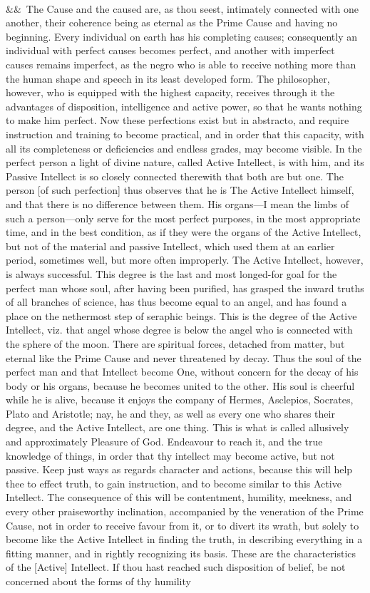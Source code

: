 \documentclass[12pt]{article}
\newcommand{\para}[1][]{\par\noindent\ifx&#1&\else\textsuperscript{\footnotesize #1}~\fi}
\begin{document}
\para The Cause and the caused are, as thou seest, intimately connected with one another, their coherence being as eternal as the Prime Cause and having no beginning. Every individual on earth has his completing causes; consequently an individual with perfect causes becomes perfect, and another with imperfect causes remains imperfect, as the negro who is able to receive nothing more than the human shape and speech in its least developed form. The philosopher, however, who is equipped with the highest capacity, receives through it the advantages of disposition, intelligence and active power, so that he wants nothing to make him perfect. Now these perfections exist but in abstracto, and require instruction and training to become practical, and in order that this capacity, with all its completeness or deficiencies and endless grades, may become visible. In the perfect person a light of divine nature, called Active Intellect, is with him, and its Passive Intellect is so closely connected therewith that both are but one. The person [of such perfection] thus observes that he is The Active Intellect himself, and that there is no difference between them. His organs---I mean the limbs of such a person---only serve for the most perfect purposes, in the most appropriate time, and in the best condition, as if they were the organs of the Active Intellect, but not of the material and passive Intellect, which used them at an earlier period, sometimes well, but more often improperly. The Active Intellect, however, is always successful. This degree is the last and most longed-for goal for the perfect man whose soul, after having been purified, has grasped the inward truths of all branches of science, has thus become equal to an angel, and has found a place on the nethermost step of seraphic beings. This is the degree of the Active Intellect, viz. that angel whose degree is below the angel who is connected with the sphere of the moon. There are spiritual forces, detached from matter, but eternal like the Prime Cause and never threatened by decay. Thus the soul of the perfect man and that Intellect become One, without concern for the decay of his body or his organs, because he becomes united to the other. His soul is cheerful while he is alive, because it enjoys the company of Hermes, Asclepios, Socrates, Plato and Aristotle; nay, he and they, as well as every one who shares their degree, and the Active Intellect, are one thing. This is what is called allusively and approximately Pleasure of God. Endeavour to reach it, and the true knowledge of things, in order that thy intellect may become active, but not passive. Keep just ways as regards character and actions, because this will help thee to effect truth, to gain instruction, and to become similar to this Active Intellect. The consequence of this will be contentment, humility, meekness, and every other praiseworthy inclination, accompanied by the veneration of the Prime Cause, not in order to receive favour from it, or to divert its wrath, but solely to become like the Active Intellect in finding the truth, in describing everything in a fitting manner, and in rightly recognizing its basis. These are the characteristics of the [Active] Intellect. If thou hast reached such disposition of belief, be not concerned about the forms of thy humility 
\end{document}
